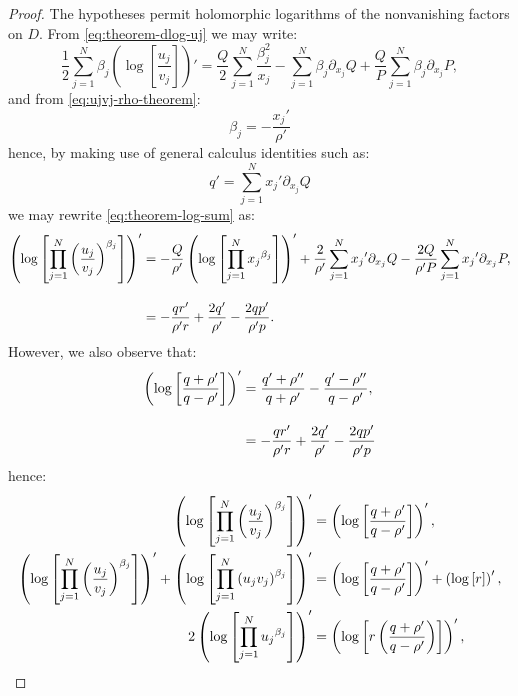 \documentclass[11pt,a4paper]{article}
\numberwithin{equation}{section}
\begin{document}
\begin{proof}
The hypotheses permit holomorphic logarithms of the nonvanishing factors on $D$. From \eqref{eq:theorem-dlog-uj} we may write:
\begin{equation}
    \frac{1}{2}\sum_{j=1}^{N}\beta_j\left(\log{\left[\frac{u_j}{v_j}\right]}\right)' = \frac{Q}{2}\sum_{j=1}^{N}\frac{\beta_j^2}{x_j} - \sum_{j=1}^{N}\beta_j\partial_{x_j}Q + \frac{Q}{P}\sum_{j=1}^{N}\beta_j\partial_{x_j}P, \label{eq:theorem-log-sum}
\end{equation}
and from \eqref{eq:ujvj-rho-theorem}:
\begin{equation*}
    \beta_j = -\frac{{x_j}'}{\rho'}
\end{equation*}
hence, by making use of general calculus identities such as:
\begin{equation*}
    q' = \sum_{j=1}^{N}{x_j}'\partial_{x_j}Q
\end{equation*}
we may rewrite \eqref{eq:theorem-log-sum} as:
\begin{align}
    \left(\log{\left[\prod_{j=1}^{N}\left(\frac{u_j}{v_j}\right)^{\beta_j}\right]}\right)' &= -\frac{Q}{\rho'}\left(\log{\left[\prod_{j=1}^{N}{x_j}^{\beta_j}\right]}\right)' + \frac{2}{\rho'}\sum_{j=1}^{N}{x_j}'\partial_{x_j}Q - \frac{2Q}{\rho' P}\sum_{j=1}^{N}{x_j}'\partial_{x_j}P, \notag \\[10pt]
    &= -\frac{q r'}{\rho' r} + \frac{2 q'}{\rho'} - \frac{2 q p'}{\rho' p}. \label{eq:theorem-log-sum-2}
\end{align}
However, we also observe that:
\begin{align}
    \left(\log{\left[\frac{q + \rho'}{q - \rho'}\right]}\right)' &= \frac{q' + \rho''}{q + \rho'} - \frac{q' - \rho''}{q - \rho'}, \notag \\[10pt]
    &= -\frac{q r'}{\rho' r} + \frac{2q'}{\rho'} - \frac{2 q p'}{\rho' p}
\end{align}
hence:
\begin{align}
    \left(\log{\left[\prod_{j=1}^{N}\left(\frac{u_j}{v_j}\right)^{\beta_j}\right]}\right)'  &= \left(\log{\left[\frac{q + \rho'}{q - \rho'}\right]}\right)', \notag \\
    \left(\log{\left[\prod_{j=1}^{N}\left(\frac{u_j}{v_j}\right)^{\beta_j}\right]}\right)' + \left(\log{\left[\prod_{j=1}^{N}\left(u_j v_j\right)^{\beta_j}\right]}\right)'  &= \left(\log{\left[\frac{q + \rho'}{q - \rho'}\right]}\right)' + \left(\log{\left[r\right]}\right)', \notag \\
    2\left(\log{\left[\prod_{j=1}^{N}{u_j}^{\beta_j}\right]}\right)'  &= \left(\log{\left[r\left(\frac{q + \rho'}{q - \rho'}\right)\right]}\right)', \notag \\

\end{align}
\end{proof}
\end{document}
